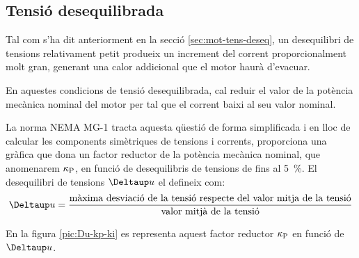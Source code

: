 \subsection{Tensió desequilibrada}\label{sec:NEMA-U-deseq}

Tal com s'ha dit anteriorment en la secció \ref{sec:mot-tens-deseq}, un desequilibri de tensions relativament petit produeix un increment del corrent proporcionalment molt gran, generant una  calor addicional que el motor haurà d'evacuar.

En aquestes condicions de tensió desequilibrada, cal reduir el valor de la potència mecànica nominal del motor per tal que el corrent baixi al seu valor nominal.

La norma NEMA MG-1 tracta aquesta qüestió de forma simplificada i en lloc de calcular les components simètriques de tensions i corrents, proporciona una gràfica que dona un factor reductor de la potència mecànica nominal, que anomenarem $\kappa_\mathrm{P}$, en funció de desequilibris de tensions de fins al \qty{5}{\%}. El desequilibri de tensions $\Deltaup u$ el defineix com:
\[
    \Deltaup u = \frac{\text{màxima desviació de la tensió respecte del valor mitja de la tensió}}{\text{valor mitjà de la tensió}}
\]

En la figura \vref{pic:Du-kp-ki} es representa aquest factor reductor $\kappa_\mathrm{P}$ en funció de $\Deltaup u$.

\begin{center}
    
    \label{pic:Du-kp-ki}
\end{center}



